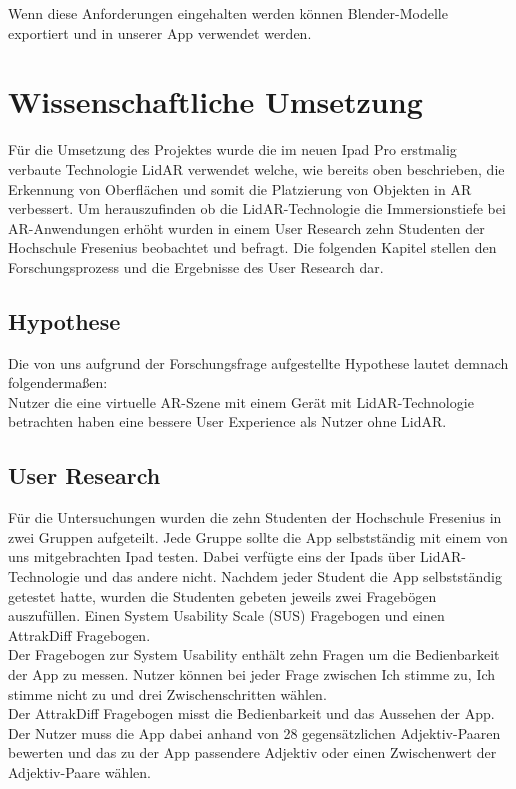 \documentclass[12pt,a4paper]{article}
\begin{document}
Wenn diese Anforderungen eingehalten werden können Blender-Modelle exportiert und in unserer App verwendet werden.
\section{Wissenschaftliche Umsetzung}
Für die Umsetzung des Projektes wurde die im neuen Ipad Pro erstmalig verbaute Technologie LidAR verwendet welche, wie bereits oben beschrieben, die Erkennung von Oberflächen und somit die Platzierung von Objekten in AR verbessert. Um herauszufinden ob die LidAR-Technologie die Immersionstiefe bei AR-Anwendungen erhöht wurden in einem User Research zehn Studenten der Hochschule Fresenius beobachtet und befragt. Die folgenden Kapitel stellen den Forschungsprozess und die Ergebnisse des User Research dar.
\subsection{Hypothese}
Die von uns aufgrund der Forschungsfrage aufgestellte Hypothese lautet demnach folgendermaßen:\\

\glqq Nutzer die eine virtuelle AR-Szene mit einem Gerät mit LidAR-Technologie betrachten haben eine bessere User Experience als Nutzer ohne LidAR. \grqq{}
\subsection{User Research}
Für die Untersuchungen wurden die zehn Studenten der Hochschule Fresenius in zwei Gruppen aufgeteilt. Jede Gruppe sollte die App selbstständig mit einem von uns mitgebrachten Ipad testen. Dabei verfügte eins der Ipads über LidAR-Technologie und das andere nicht. Nachdem jeder Student die App selbstständig getestet hatte, wurden die Studenten gebeten jeweils zwei Fragebögen auszufüllen. Einen System Usability Scale (SUS) \cite{SUS} Fragebogen und einen AttrakDiff \cite{AttrakDiff} Fragebogen.\\ 
Der Fragebogen zur System Usability enthält zehn Fragen um die Bedienbarkeit der App zu messen. Nutzer können bei jeder Frage zwischen \glqq Ich stimme zu\grqq, \glqq Ich stimme nicht zu\grqq{} und drei Zwischenschritten wählen.\\ 
Der AttrakDiff Fragebogen misst die Bedienbarkeit und das Aussehen der App. Der Nutzer muss die App dabei anhand von 28 gegensätzlichen Adjektiv-Paaren bewerten und das zu der App passendere Adjektiv oder einen Zwischenwert der Adjektiv-Paare wählen.
\end{document}
